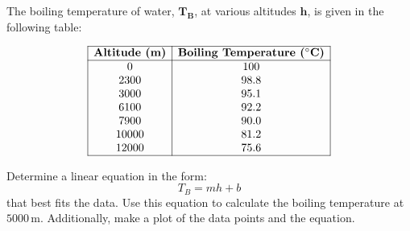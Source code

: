 \documentclass[a4paper, 12pt]{report}
\def\ni{green!60!black!40!white}
\begin{document}
\begin{tcolorbox}[title={\color{black}\section{Q1}}, colback=white, colframe=\ni, boxrule=1mm, width=1\textwidth]
    The boiling temperature of water, \(\mathbf{T_B}\), at various altitudes \(\mathbf{h}\), is given in the following table:
    
    \[
    \begin{array}{|c|c|}
        \hline
        \textbf{Altitude (m)} & \textbf{Boiling Temperature (\(^\circ\text{C}\))} \\ \hline
        0 & 100 \\ 
        2300 & 98.8 \\ 
        3000 & 95.1 \\ 
        6100 & 92.2 \\ 
        7900 & 90.0 \\ 
        10000 & 81.2 \\ 
        12000 & 75.6 \\ \hline
    \end{array}
    \]
    
    Determine a linear equation in the form:
    \[
    T_B = mh + b
    \]
    that best fits the data. Use this equation to calculate the boiling temperature at \(5000 \, \text{m}\). Additionally, make a plot of the data points and the equation.
\end{tcolorbox}
\end{document}
